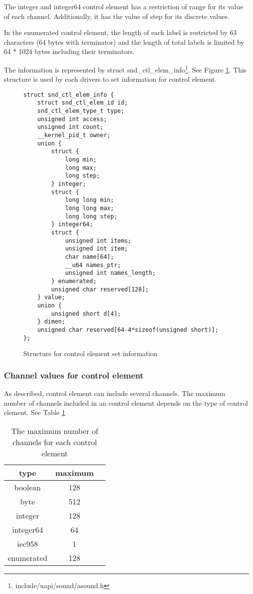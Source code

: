 \documentclass[onecolumn]{article}
\begin{document}
The integer and integer64 control element has a restriction of range for its value of each channel. Additionally, it has the value of step for its discrete values.

In the enumerated control element, the length of each label is restricted by 63 characters (64 bytes with terminator) and the length of total labels is limited by 64 * 1024 bytes including their terminators.

The information is represented by struct snd\_ctl\_elem\_info\footnote{include/uapi/sound/asound.h}. See Figure \ref{fig:element-set-info-structure}. This structure is used by each drivers to set information for control element.

\begin{figure}[htbp]
\small
\begin{verbatim}
struct snd_ctl_elem_info {
    struct snd_ctl_elem_id id;
    snd_ctl_elem_type_t type;
    unsigned int access;
    unsigned int count;
    __kernel_pid_t owner;
    union {
        struct {
            long min;
            long max;
            long step;
        } integer;
        struct {
            long long min;
            long long max;
            long long step;
        } integer64;
        struct {
            unsigned int items;
            unsigned int item;
            char name[64];
            __u64 names_ptr;
            unsigned int names_length;
        } enumerated;
        unsigned char reserved[128];
    } value;
    union {
        unsigned short d[4];
    } dimen;
    unsigned char reserved[64-4*sizeof(unsigned short)];
};
\end{verbatim}
\caption{{Structure for control element set information}}
\label{fig:element-set-info-structure}
\end{figure}


\subsubsection{Channel values for control element}

As described, control element can include several channels. The maximum number of channels included in an control element depends on the type of control element. See Table \ref{tbl:max-channels}

\begin{table}[H]
        \centering
        \caption{{The maximum number of channels for each control element}}
        \label{tbl:max-channels}
        \begin{tabular}{ccc} \toprule
		type & maximum \\ \midrule
		boolean & 128 \\
		byte & 512 \\
		integer & 128 \\
		integer64 & 64 \\
		iec958 & 1 \\
		enumerated & 128 \\ \bottomrule
        \end{tabular}
\end{table}
\end{document}
